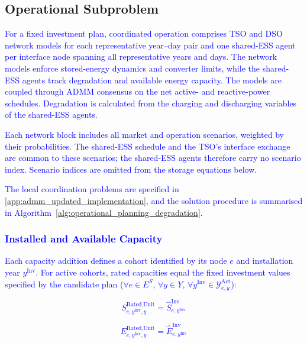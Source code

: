 \documentclass[preprint,12pt]{elsarticle}
\begin{document}
\subsection{Operational Subproblem}
\label{subsec:subproblem}

\textcolor{blue}{
    For a fixed investment plan, coordinated operation comprises TSO and DSO network models for each representative year--day pair and one shared-ESS agent per interface node spanning all representative years and days. The network models enforce stored-energy dynamics and converter limits, while the shared-ESS agents track degradation and available energy capacity. The models are coupled through ADMM consensus on the net active- and reactive-power schedules.
    Degradation is calculated from the charging and discharging variables of the shared-ESS agents.
}

\textcolor{blue}{
    Each network block includes all market and operation scenarios, weighted by their probabilities. The shared-ESS schedule and the TSO's interface exchange are common to these scenarios; the shared-ESS agents therefore carry no scenario index. Scenario indices are omitted from the storage equations below.
}

\textcolor{blue}{
    The local coordination problems are specified in \ref{app:admm_updated_implementation}, and the solution procedure is summarised in Algorithm~\ref{alg:operational_planning_degradation}.
}

\subsubsection{\textcolor{blue}{Installed and Available Capacity}}
\label{subsubsec:capacity}

\textcolor{blue}{
    Each capacity addition defines a cohort identified by its node $e$ and installation year $y^{\text{Inv}}$.
    For active cohorts, rated capacities equal the fixed investment values specified by the candidate plan ($\forall e\in E^S$, $\forall y\in Y$, $\forall y^{\text{Inv}}\in\mathcal{Y}^{\text{Act}}_{e,y}$):
}

\textcolor{blue}{
    \begin{equation}
        S^{\text{Rated,Unit}}_{e,y^\text{Inv},y} = \hat{S}^{\text{Inv}}_{e,y^\text{Inv}}
        \label{eq:cohort_rated}
    \end{equation}
}

\textcolor{blue}{
    \begin{equation}
        E^{\text{Rated,Unit}}_{e,y^\text{Inv},y} = \hat{E}^{\text{Inv}}_{e,y^\text{Inv}}
        \label{eq:cohort_rated_energy}
    \end{equation}
}
\end{document}
